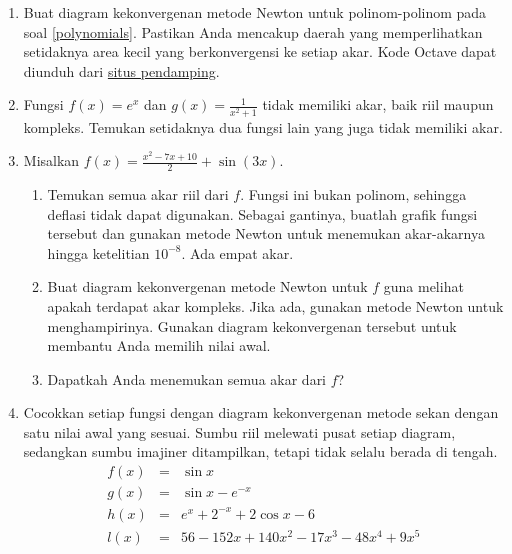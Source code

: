 \begin{small}
\begin{enumerate}
\begin{enumerate}
\item $-7,2,1\pm5i$
\item $-7,2,1+5i$
\item \label{exc:more-2}$-4,-1,2,\pm2i$  \hasasolution 
\item \label{exc:more-4}$-4,-1,2,2i$  \hasasolution 
\item $0,-1\pm i,1\pm i$
\item $-3+i,-2-i,-3i,1-2i$
\end{enumerate}
\item \label{newton}Buat diagram kekonvergenan metode Newton untuk polinom-polinom
pada soal \ref{polynomials}. Pastikan Anda mencakup daerah yang memperlihatkan
setidaknya area kecil yang berkonvergensi ke setiap akar. Kode Octave
dapat diunduh dari \href{http://lqbrin.github.io/tea-time-numerical/ancillaries.html}{situs pendamping}.
\item \label{noroot}Fungsi $f(x)=e^{x}$ dan $g(x)=\frac{1}{x^{2}+1}$
tidak memiliki akar, baik riil maupun kompleks. Temukan setidaknya
dua fungsi lain yang juga tidak memiliki akar.
\item \label{failure}Misalkan $f(x)=\frac{x^{2}-7x+10}{2}+\sin(3x)$.

\begin{enumerate}
\item Temukan semua akar riil dari $f$. Fungsi ini bukan polinom, sehingga
deflasi tidak dapat digunakan. Sebagai gantinya, buatlah grafik fungsi
tersebut dan gunakan metode Newton untuk menemukan akar-akarnya hingga
ketelitian $10^{-8}$. Ada empat akar. 
\item Buat diagram kekonvergenan metode Newton untuk $f$ guna melihat apakah
terdapat akar kompleks. Jika ada, gunakan metode Newton untuk menghampirinya.
Gunakan diagram kekonvergenan tersebut untuk membantu Anda memilih
nilai awal.
\item Dapatkah Anda menemukan semua akar dari $f$?
\end{enumerate}
\item \label{exc:more-3}Cocokkan setiap fungsi dengan diagram kekonvergenan
metode sekan dengan satu nilai awal yang sesuai. Sumbu riil melewati
pusat setiap diagram, sedangkan sumbu imajiner ditampilkan, tetapi
tidak selalu berada di tengah. \hasasolution  
\begin{eqnarray*}
f(x) & = & \sin x\\
g(x) & = & \sin x-e^{-x}\\
h(x) & = & e^{x}+2^{-x}+2\cos x-6\\
l(x) & = & 56-152x+140x^{2}-17x^{3}-48x^{4}+9x^{5}
\end{eqnarray*}


\end{enumerate}
\end{small}
